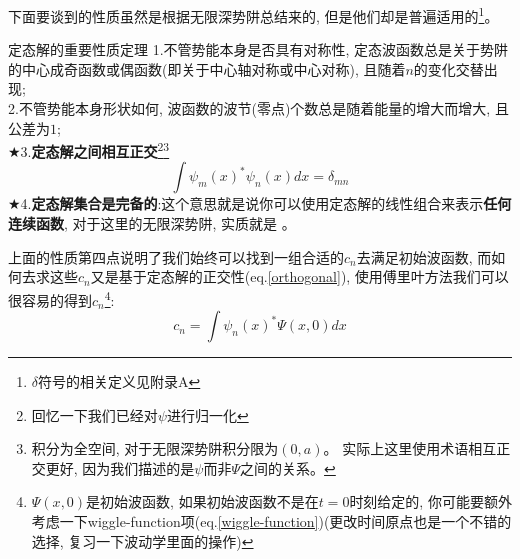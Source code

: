 \documentclass[a4paper,zihao=-4,linespread=1]{ctexrep}
\newenvironment{lequation}{\large\begin{equation}}{\end{equation}}
\begin{document}
    下面要谈到的性质虽然是根据无限深势阱总结来的, 但是他们却是普遍适用的\footnote[5]{$\delta$符号的相关定义见附录A}。
    \begin{theorem}{定态解的重要性质定理}
        1.不管势能本身是否具有对称性, 定态波函数总是关于势阱的中心成奇函数或偶函数(即关于中心轴对称或中心对称), 且随着$n$的变化交替出现;\\
        2.不管势能本身形状如何, 波函数的波节(零点)个数总是随着能量的增大而增大, 且公差为$1$;\\
        $\bigstar$3.\textbf{定态解之间相互正交}\footnote{回忆一下我们已经对$\psi$进行归一化}\footnote{积分为全空间, 对于无限深势阱积分限为$(0,a)$。
        实际上这里使用术语相互正交更好, 因为我们描述的是$\psi$而非$\Psi$之间的关系。}
        \begin{lequation}
            \label{orthogonal}
            \int \psi_m(x)^*\psi_n(x) dx=\delta_{mn}
        \end{lequation} 
        $\bigstar$4.\textbf{定态解集合是完备的}:这个意思就是说你可以使用定态解的线性组合来表示\textbf{任何连续函数}, 对于这里的无限深势阱, 实质就是
        。
    \end{theorem}
    上面的性质第四点说明了我们始终可以找到一组合适的$c_n$去满足初始波函数, 而如何去求这些$c_n$又是基于定态解的正交性(eq.\ref{orthogonal}), 使用傅里叶方法我们可以
    很容易的得到$c_n$\footnote[1]{$\Psi(x,0)$是初始波函数, 如果初始波函数不是在$t=0$时刻给定的, 你可能要额外考虑一下wiggle-function项(eq.\ref{wiggle-function})(更改时间原点也是一个不错的选择, 复习一下波动学里面的操作)}:
    \begin{lequation}
        \boxed{
            c_n=\int \psi_n(x)^*\Psi(x,0) dx
        }
    \end{lequation}
\end{document}

